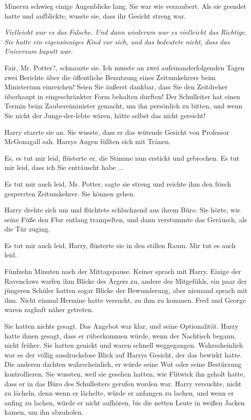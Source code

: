 Minerva schwieg einige Augenblicke lang. Sie war wie verzaubert. Als sie geendet
hatte und aufblickte, wusste sie, dass ihr Gesicht streng war.

\emph{Vielleicht war es das Falsche. Und dann wiederum war es vielleicht das
Richtige. Sie hatte ein eigensinniges Kind vor sich, und das bedeutete nicht,
dass das Universum kaputt war.}

\glqq Fair, Mr. Potter?\grqq{}, schnauzte sie. \glqq Ich musste an zwei
aufeinanderfolgenden Tagen zwei Berichte über die öffentliche Benutzung eines
Zeitumkehrers beim Ministerium einreichen! Seien Sie äußerst dankbar, dass Sie
den Zeitdreher überhaupt in eingeschränkter Form behalten durften! Der
Schulleiter hat einen Termin beim Zaubereiminister gemacht, um ihn persönlich zu
bitten, und wenn Sie nicht der Junge-der-lebte wären, hätte selbst das nicht
gereicht!\grqq{}

Harry starrte sie an. Sie wusste, dass er das wütende Gesicht von Professor
McGonagall sah. Harrys Augen füllten sich mit Tränen.

\glqq Es, es tut mir leid\grqq{}, flüsterte er, die Stimme nun erstickt und
gebrochen. \glqq Es tut mir leid, dass ich Sie enttäuscht habe ...\grqq{}

\glqq Es tut mir auch leid, Mr. Potter\grqq{}, sagte sie streng und reichte ihm
den frisch gesperrten Zeitumkehrer. \glqq Sie können gehen.\grqq{}

Harry drehte sich um und flüchtete schluchzend aus ihrem Büro. Sie hörte, wie
seine Füße den Flur entlang trampelten, und dann verstummte das Geräusch, als
die Tür zuging.

\glqq Es tut mir auch leid, Harry\grqq{}, flüsterte sie in den stillen Raum.
\glqq Mir tut es auch leid.\grqq{}

Fünfzehn Minuten nach der Mittagspause. Keiner sprach mit Harry. Einige der
Ravenclaws warfen ihm Blicke des Ärgers zu, andere des Mitgefühls, ein paar der
jüngeren Schüler hatten sogar Blicke der Bewunderung, aber niemand sprach mit
ihm. Nicht einmal Hermine hatte versucht, zu ihm zu kommen. Fred und George
waren zaghaft näher getreten.

Sie hatten nichts gesagt. Das Angebot war klar, und seine Optionalität. Harry
hatte ihnen gesagt, dass er rüberkommen würde, wenn der Nachtisch begann, nicht
früher. Sie hatten genickt und waren schnell weggegangen. Wahrscheinlich war es
der völlig ausdruckslose Blick auf Harrys Gesicht, der das bewirkt hatte. Die
anderen dachten wahrscheinlich, er würde seine Wut oder seine Bestürzung
kontrollieren. Sie wussten, weil sie gesehen hatten, wie Flitwick ihn geholt
hatte, dass er in das Büro des Schulleiters gerufen worden war. Harry versuchte,
nicht zu lächeln, denn wenn er lächelte, würde er anfangen zu lachen, und wenn
er anfing zu lachen, würde er nicht aufhören, bis die netten Leute in weißen
Jacken kamen, um ihn abzuholen.

